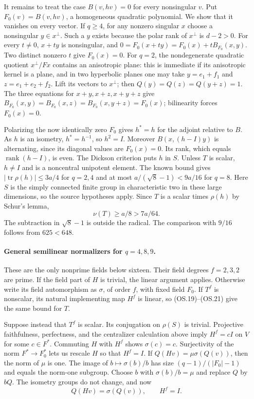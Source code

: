 It remains to treat the case $B(v,hv)=0$ for every nonsingular $v$.
Put $F_0(v)=B(v,hv)$, a homogeneous quadratic polynomial.  We show
that it vanishes on every vector.  If $q\ge4$, for any nonzero
singular $x$ choose a nonsingular $y\in x^\perp$.  Such a $y$
exists because the polar rank of $x^\perp$ is $d-2>0$.
For every $t\ne0$, $x+ty$ is nonsingular, and
$0=F_0(x+ty)=F_0(x)+tB_{F_0}(x,y)$.
Two distinct nonzero $t$ give $F_0(x)=0$.
For $q=2$, the nondegenerate quadratic quotient
$x^\perp/Fx$ contains an anisotropic plane: this is immediate if
its anisotropic kernel is a plane, and in two hyperbolic planes
one may take $y=e_1+f_1$ and $z=e_1+e_2+f_2$.
Lift its vectors to $x^\perp$; then
$Q(y)=Q(z)=Q(y+z)=1$.  The three equations for
$x+y,x+z,x+y+z$ give
$B_{F_0}(x,y)=B_{F_0}(x,z)=B_{F_0}(x,y+z)=F_0(x)$;
bilinearity forces $F_0(x)=0$.

Polarizing the now identically zero $F_0$ gives $h^*=h$ for the
adjoint relative to $B$.  As $h$ is an isometry, $h^*=h^{-1}$,
so $h^2=I$.  Moreover $B(x,(h-I)y)$ is alternating, since its
diagonal values are $F_0(x)=0$.  Its rank, which equals
$\operatorname{rank}(h-I)$, is even.  The Dickson criterion puts
$h$ in $S$.  Unless $T$ is scalar, $h\ne I$ and is a noncentral
unipotent element.  The known bound
\cite[Theorem~2.4(i), with conventions on pp.~2--4]{HES:Liebeck2017}
gives $|\operatorname{tr}\rho(h)|\le3a/4$ for $q=2,4$ and at most
$a/(\sqrt8-1)<9a/16$ for $q=8$.
Here $S$ is the simply connected finite group in characteristic
two in these large dimensions, so the source hypotheses apply.
Since $T$ is a scalar times $\rho(h)$ by Schur's lemma,
\[
                         \nu(T)\ge a/8>7a/64.
 \tag{OS.21}
\]
The subtraction in $\sqrt8-1$ is outside the radical.  The
comparison with $9/16$ follows from $625<648$.

\paragraph{General semilinear normalizers for $q=4,8,9$.}
These are the only nonprime fields below sixteen.  Their field
degrees $f=2,3,2$ are prime.  If the field part of $H$ is trivial,
the linear argument applies.  Otherwise write its field
automorphism as $\sigma$, of order $f$, with fixed field $F_0$.
If $T^f$ is nonscalar, its natural implementing map $H^f$ is linear,
so (OS.19)--(OS.21) give the same bound for $T$.

Suppose instead that $T^f$ is scalar.  Its conjugation on $\rho(S)$
is trivial.  Projective faithfulness, perfectness, and the centralizer
calculation above imply $H^f=cI$ on $V$ for some $c\in F^*$.
Commuting $H$ with $H^f$ shows $\sigma(c)=c$.  Surjectivity of the
norm $F^*\to F_0^*$ lets us rescale $H$ so that $H^f=I$.
If $Q(Hv)=\mu\sigma(Q(v))$, then the norm of $\mu$ is one.
The image of $b\mapsto\sigma(b)/b$ has size
$(q-1)/(|F_0|-1)$ and equals the norm-one subgroup.  Choose $b$
with $\sigma(b)/b=\mu$ and replace $Q$ by $bQ$.
The isometry groups do not change, and now
\[
                      Q(Hv)=\sigma(Q(v)),\qquad H^f=I.
 \tag{OS.22}
\]

